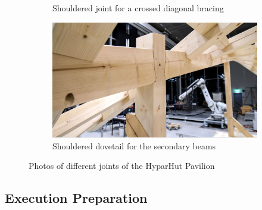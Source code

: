 \begin{figure}[!h]
\begin{subfigure}[b]{0.49\textwidth}
        \caption{Shouldered joint for a crossed diagonal bracing}
        \label{fig:shouldered-joint-for-a-crossed-diagonal-bracing}
    \end{subfigure}
    \hfill
    \begin{subfigure}[b]{0.49\textwidth}
        \centering
        \includegraphics[width=\textwidth]{images/7b/img11.jpg}
        \caption{Shouldered dovetail for the secondary beams}
    \end{subfigure}
    \caption{Photos of different joints of the HyparHut Pavilion}
    \label{fig:photos-of-different-joints-of-the-hyparhut-pavilion}
\end{figure}


\subsection{Execution Preparation}
\label{subsection:exploration-4-execution-plan}

